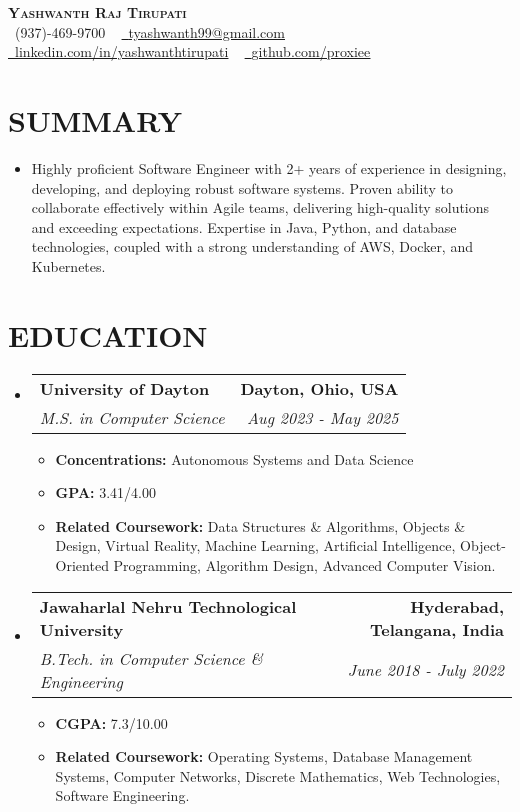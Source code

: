 \documentclass[letterpaper,11pt]{article}
\makeatletter
\newcommand{\resumeItem}[1]{\item\small{{#1 \vspace{-2pt}}}}
\newcommand{\resumeSubheading}[4]{\vspace{-2pt}\item\begin{tabular*}{0.97\textwidth}[t]{l@{\extracolsep{\fill}}r}\textbf{#1} & #2 \\\textit{\small#3} & \textit{\small #4} \\\end{tabular*}\vspace{-7pt}}
\newcommand{\resumeSubHeadingListStart}{\begin{itemize}[leftmargin=0.15in, label={}]}
\newcommand{\resumeSubHeadingListEnd}{\end{itemize}}
\newcommand{\resumeItemListStart}{\begin{itemize}}
\newcommand{\resumeItemListEnd}{\end{itemize}\vspace{-5pt}}
\makeatother
\begin{document}
\begin{center}
    \textbf{\Huge \scshape {\fontsize{15pt}{20pt}\selectfont Yashwanth Raj Tirupati}} \\ \vspace{1pt}
    \small \raisebox{-0.1\height}\faPhone\ (937)-469-9700 ~ \href{mailto:tyashwanth99@gmail.com}{\raisebox{-0.2\height}\faEnvelope\  \underline{tyashwanth99@gmail.com}} ~ 
    \href{https://linkedin.com/in/yashwanthtirupati}{\raisebox{-0.2\height}\faLinkedin\ \underline{linkedin.com/in/yashwanthtirupati}} ~ 
    \href{https://github.com/proxiee}{\raisebox{-0.2\height}\faGithub\ \underline{github.com/proxiee}}
    \vspace{-8pt}
\end{center}


\section{{\fontsize{9pt}{20pt}\selectfont \textbf{SUMMARY}}}
\resumeSubHeadingListStart

\resumeItem{Highly proficient Software Engineer with 2+ years of experience in designing, developing, and deploying robust software systems.  Proven ability to collaborate effectively within Agile teams, delivering high-quality solutions and exceeding expectations. Expertise in Java, Python, and database technologies, coupled with a strong understanding of AWS, Docker, and Kubernetes.}
\resumeSubHeadingListEnd
\vspace{-18pt}

\section{{\fontsize{9pt}{20pt}\selectfont \textbf{EDUCATION}}}
\resumeSubHeadingListStart
\resumeSubheading{University of Dayton}{\textbf{Dayton, Ohio, USA}}{M.S. in Computer Science}{Aug 2023 - May 2025}
\resumeItemListStart
\resumeItem{\textbf{Concentrations:} Autonomous Systems and Data Science}
\resumeItem{\textbf{GPA:} 3.41/4.00}
\resumeItem{\textbf{Related Coursework:} Data Structures \& Algorithms, Objects \& Design, Virtual Reality, Machine Learning, Artificial Intelligence, Object-Oriented Programming, Algorithm Design, Advanced Computer Vision.}
\resumeItemListEnd
\resumeSubheading{Jawaharlal Nehru Technological University}{\textbf{Hyderabad, Telangana, India}}{B.Tech. in Computer Science \& Engineering}{June 2018 - July 2022}
\resumeItemListStart
\resumeItem{\textbf{CGPA:} 7.3/10.00}
\resumeItem{\textbf{Related Coursework:} Operating Systems, Database Management Systems, Computer Networks, Discrete Mathematics, Web Technologies, Software Engineering.}
\resumeItemListEnd
\resumeSubHeadingListEnd
\vspace{-18pt}
\end{document}
